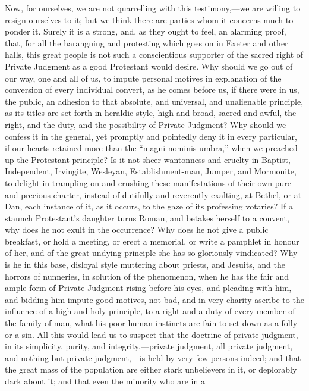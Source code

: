 Now, for ourselves, we are not quarrelling with this testimony,—we
are willing to resign ourselves to it; but we think there are parties
whom it concerns much to ponder it. Surely it is a strong, and, as
they ought to feel, an alarming proof, that, for all the haranguing
and protesting which goes on in Exeter and other halls, this great
people is not such a conscientious supporter of the sacred right of
Private Judgment as a good Protestant would desire. Why should we go
out of our way, one and all of us, to impute personal motives in
explanation of the conversion of every individual convert, as he
comes before us, if there were in us, the public, an adhesion to that
absolute, and universal, and unalienable principle, as its titles are
set forth in heraldic style, high and broad, sacred and awful, the
right, and the duty, and the possibility of Private Judgment? Why
should we confess it in the general, yet promptly and pointedly deny
it in every particular, if our hearts retained more than the ``magni
nominis umbra,'' when we preached up the Protestant principle? Is
it not sheer wantonness and cruelty in Baptist, Independent, Irvingite,
Wesleyan, Establishment-man, Jumper, and Mormonite, to delight in
trampling on and crushing these manifestations of their own pure and
precious charter, instead of dutifully and reverently exalting, at
Bethel, or at Dan, each instance of it, as it occurs, to the gaze of
its professing votaries? If a staunch Protestant's daughter turns
Roman, and betakes herself to a convent, why does he not exult in the
occurrence? Why does he not give a public breakfast, or hold a
meeting, or erect a memorial, or write a pamphlet in honour of her,
and of the great undying principle she has so gloriously vindicated?
Why is he in this base, disloyal style muttering about priests, and
Jesuits, and the horrors of nunneries, in solution of the phenomenon,
when he has the fair and ample form of Private Judgment rising before
his eyes, and pleading with him, and bidding him impute good motives,
not bad, and in very charity ascribe to the influence of a high and
holy principle, to a right and a duty of every member of the family of
man, what his poor human instincts are fain to set down as a folly or
a sin. All this would lead us to suspect that the doctrine of private
judgment, in its simplicity, purity, and integrity,—private
judgment, all private judgment, and nothing but private
judgment,—is held by very few persons indeed; and that the great
mass of the population are either stark unbelievers in it, or
deplorably dark about it; and that even the minority who are in a
